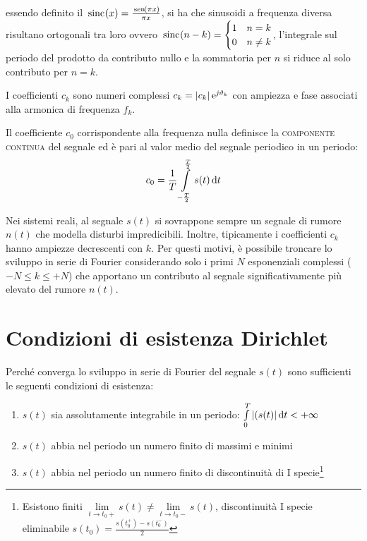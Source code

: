essendo definito il $\,{\operatorname{sinc}}^{}\!\left({x}\right)=\frac{\,{\operatorname{sen}}^{}\!\left({\pi x}\right)}{\pi x}$, si ha che sinusoidi a frequenza diversa risultano ortogonali tra loro ovvero 
$\,{\operatorname{sinc}}^{}\!\left({n-k}\right)=\begin{cases} 1 & n=k \\ 0 & n\neq k\end{cases}$, l'integrale sul periodo del prodotto da contributo nullo e la sommatoria per $n$ si riduce al solo contributo per $n=k$.

I coefficienti $c_k$ sono numeri complessi $c_k=\left|{c_k}\right|\operatorname{e}^{\operatorname{\mathit{j}\!}\vartheta_k}$ con ampiezza e fase associati alla armonica di frequenza $f_k$.

Il coefficiente $c_0$ corrispondente alla frequenza nulla definisce la \textsc{componente continua} del segnale ed è pari al valor medio del segnale periodico in un periodo:
\begin{equation}c_0=\frac{1}{T}\int\limits_{-\frac{T}{2}}^{\frac{T}{2}}{s(t)}{\,\mathop{}\!\mathrm{d}{t}}\end{equation}

\begin{nota}Nei sistemi reali, al segnale $s(t)$ si sovrappone sempre un segnale di rumore $n(t)$ che modella disturbi impredicibili. Inoltre, tipicamente i coefficienti $c_k$ hanno ampiezze decrescenti con $k$. Per questi motivi, è possibile troncare lo sviluppo in serie di Fourier considerando solo i primi $N$ esponenziali complessi ($-N\leq k \leq +N$) che apportano un contributo al segnale significativamente più elevato del rumore $n(t)$.\end{nota}

\section{Condizioni di esistenza Dirichlet}
Perché converga lo sviluppo in serie di Fourier del segnale $s(t)$ sono sufficienti le seguenti condizioni di esistenza:
\begin{enumerate}
\item $s(t)$ sia assolutamente integrabile in un periodo: $\int\limits_{0}^{T}{\left|{(s(t)}\right|}{\,\mathop{}\!\mathrm{d}{t}}<+\infty$
\item $s(t)$ abbia nel periodo un numero finito di massimi e minimi
\item $s(t)$ abbia nel periodo un numero finito di discontinuità di I specie\footnote{Esistono finiti $\lim\limits_{t\to t_0+}s(t)\neq\lim\limits_{t\to t_0-}s(t)$, discontinuità I specie eliminabile $s(t_0)=\frac{s(t_0^+)-s(t_0^-)}{2}$}
\end{enumerate}

